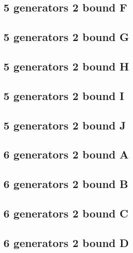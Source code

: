 \documentclass{TC}
\begin{document}
{\subsection{5 generators 2 bound F}
\label{fail3}

\newpage

\subsection{5 generators 2 bound G}

\newpage

\subsection{5 generators 2 bound H}

\newpage

\subsection{5 generators 2 bound I}
\label{fail4} %

\newpage

\subsection{5 generators 2 bound J}

\newpage




\subsection{6 generators 2 bound A}
\label{fail5} %

\newpage

\subsection{6 generators 2 bound B}
\label{fail6} %

\newpage


\subsection{6 generators 2 bound C}
\label{fail7} %

\newpage

\subsection{6 generators 2 bound D}

\newpage

}
\end{document}
